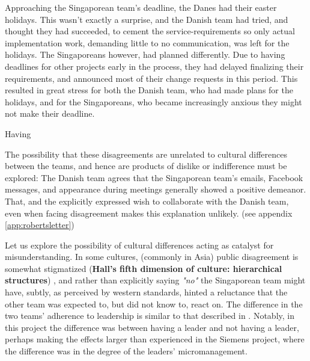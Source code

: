 Approaching the Singaporean team's deadline, the Danes had their easter
holidays. This wasn't exactly a surprise, and the Danish team had tried, and
thought they had succeeded, to cement the service-requirements so only actual
implementation work, demanding little to no communication, was left for the
holidays. The Singaporeans however, had planned differently. Due to having
deadlines for other projects early in the process, they had delayed finalizing
their requirements, and announced most of their change requests in this period.
This resulted in great stress for both the Danish team, who had made plans for
the holidays, and for the Singaporeans, who became increasingly anxious they
might not make their deadline.

Having 

The possibility that these disagreements are unrelated to cultural differences
between the teams, and hence are products of dislike or indifference must be
explored: The Danish team agrees that the Singaporean team's emails, Facebook
messages, and appearance during meetings generally showed a positive demeanor.
That, and the explicitly expressed wish to collaborate with the Danish team,
even when facing disagreement makes this explanation unlikely. (see appendix
\ref{app:robertsletter})

Let us explore the possibility of cultural differences acting as catalyst for
misunderstanding. In some cultures, (commonly in Asia) public disagreement is
somewhat stigmatized (\textbf{Hall's fifth dimension of culture: hierarchical
structures}) \cite{surprises}\cite{herbsiemens}, and rather
than explicitly saying \emph{"no"} the Singaporean team might have, subtly, as
perceived by western standards, hinted a reluctance that the other team was
expected to, but did not know to, react on.
The difference in the two teams' adherence to leadership is similar to that
described in \cite{herbsiemens}. Notably, in this project the difference was
between having a leader and not having a leader, perhaps making the effects
larger than experienced in the Siemens project, where the difference was in the
degree of  the leaders' micromanagement.

